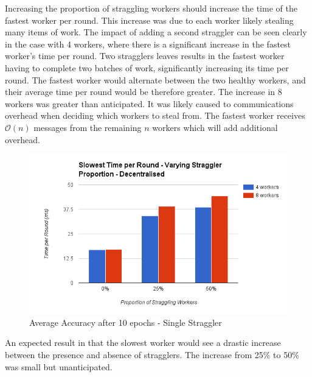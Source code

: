 \documentclass[12pt]{article}
\begin{document}
Increasing the proportion of straggling workers should increase the time of the fastest worker per round. This increase was due to each worker likely stealing many items of work. The impact of adding a second straggler can be seen clearly in the case with 4 workers, where there is a significant increase in the fastest worker's time per round. Two stragglers leaves results in the fastest worker having to complete two batches of work, significantly increasing its time per round. The fastest worker would alternate between the two healthy workers, and their average time per round would be therefore greater.
\newline
\newline
The increase in 8 workers was greater than anticipated. It was likely caused to communications overhead when deciding which workers to steal from. The fastest worker receives $\mathcal{O}(n)$ messages from the remaining $n$ workers which will add additional overhead.

\begin{figure}[H]
  \centering
  \includegraphics[width=6in]{SlowestStragglerDecentralised}
  \caption[]{Average Accuracy after 10 epochs - Single Straggler}
  \label{SlowestStragglerDecentralised}
\end{figure}

An expected result in that the slowest worker would see a drastic increase between the presence and absence of stragglers. The increase from 25\% to 50\% was small but unanticipated.
\end{document}
